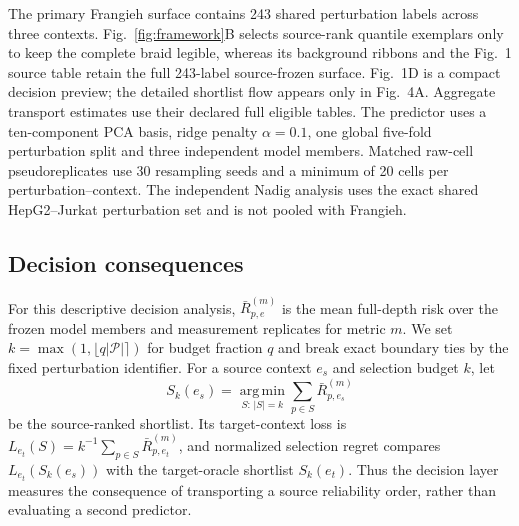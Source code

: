 \documentclass{article}
\begin{document}
The primary Frangieh surface contains 243 shared perturbation labels across
three contexts. Fig.~\ref{fig:framework}B selects source-rank quantile
exemplars only to keep the complete braid legible, whereas its background
ribbons and the Fig.~1 source table retain the full 243-label source-frozen
surface. Fig.~1D is a compact decision preview; the detailed shortlist flow
appears only in Fig.~4A. Aggregate transport estimates use their declared full eligible
tables. The predictor uses a ten-component PCA basis, ridge penalty
$\alpha=0.1$, one global five-fold perturbation split and three independent
model members. Matched raw-cell pseudoreplicates use 30 resampling seeds and a
minimum of 20 cells per perturbation--context. The independent Nadig analysis
uses the exact shared HepG2--Jurkat perturbation set and is not pooled with
Frangieh.

\subsection{Decision consequences}
For this descriptive decision analysis, $\bar R_{p,e}^{(m)}$ is the mean
full-depth risk over the frozen model members and measurement replicates for
metric $m$. We set $k=\max(1,\lfloor q|\mathcal P|\rceil)$ for budget fraction
$q$ and break exact boundary ties by the fixed perturbation identifier. For a
source context $e_s$ and selection budget $k$, let
\begin{equation}
 S_k(e_s)=\operatorname*{arg\,min}_{S:\,|S|=k}\sum_{p\in S}\bar R_{p,e_s}^{(m)}
 \label{eq:source_selection}
\end{equation}
be the source-ranked shortlist. Its target-context loss is
$L_{e_t}(S)=k^{-1}\sum_{p\in S}\bar R_{p,e_t}^{(m)}$, and normalized selection regret
compares $L_{e_t}(S_k(e_s))$ with the target-oracle shortlist $S_k(e_t)$.
Thus the decision layer measures the consequence of transporting a source
reliability order, rather than evaluating a second predictor.
\end{document}
